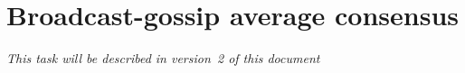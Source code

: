 \documentclass{article}
\begin{document}
%


\section{Broadcast-gossip average consensus}

\textit{This task will be described in version~2 of this document}
\end{document}
